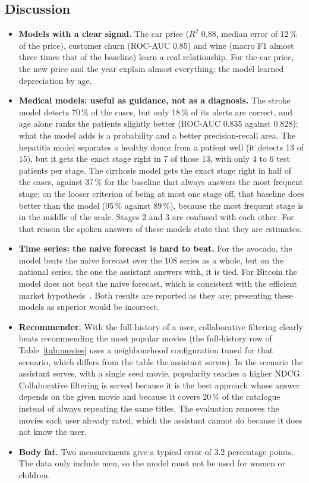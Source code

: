 \documentclass[11pt,letterpaper]{article}
\begin{document}
\subsection{Discussion}

\begin{itemize}
\item \textbf{Models with a clear signal.} The car price ($R^2$ 0.88, median error of 12\,\% of the price), customer churn (ROC-AUC 0.85) and wine (macro F1 almost three times that of the baseline) learn a real relationship. For the car price, the new price and the year explain almost everything: the model learned depreciation by age.
\item \textbf{Medical models: useful as guidance, not as a diagnosis.} The stroke model detects 70\,\% of the cases, but only 18\,\% of its alerts are correct, and age alone ranks the patients slightly better (ROC-AUC 0.835 against 0.828); what the model adds is a probability and a better precision-recall area. The hepatitis model separates a healthy donor from a patient well (it detects 13 of 15), but it gets the exact stage right in 7 of those 13, with only 4 to 6 test patients per stage. The cirrhosis model gets the exact stage right in half of the cases, against 37\,\% for the baseline that always answers the most frequent stage; on the looser criterion of being at most one stage off, that baseline does better than the model (95\,\% against 89\,\%), because the most frequent stage is in the middle of the scale. Stages 2 and 3 are confused with each other. For that reason the spoken answers of these models state that they are estimates.
\item \textbf{Time series: the naive forecast is hard to beat.} For the avocado, the model beats the naive forecast over the 108 series as a whole, but on the national series, the one the assistant answers with, it is tied. For Bitcoin the model does not beat the naive forecast, which is consistent with the efficient market hypothesis~\cite{fama1970}. Both results are reported as they are; presenting these models as superior would be incorrect.
\item \textbf{Recommender.} With the full history of a user, collaborative filtering clearly beats recommending the most popular movies (the full-history row of Table~\ref{tab:movies} uses a neighbourhood configuration tuned for that scenario, which differs from the table the assistant serves). In the scenario the assistant serves, with a single seed movie, popularity reaches a higher NDCG. Collaborative filtering is served because it is the best approach whose answer depends on the given movie and because it covers 20\,\% of the catalogue instead of always repeating the same titles. The evaluation removes the movies each user already rated, which the assistant cannot do because it does not know the user.
\item \textbf{Body fat.} Two measurements give a typical error of 3.2 percentage points. The data only include men, so the model must not be used for women or children.
\end{itemize}
\end{document}
